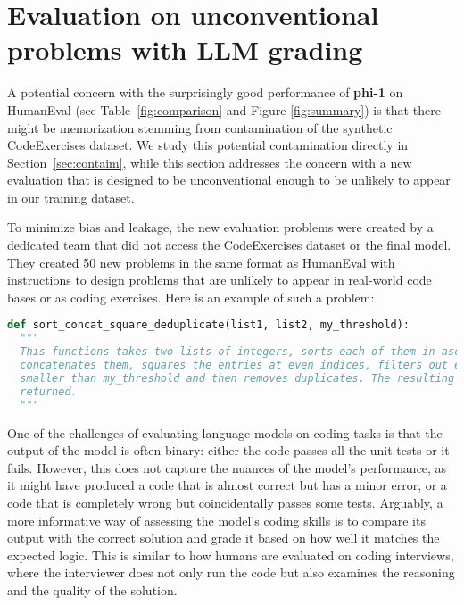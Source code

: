 \section{Evaluation on unconventional problems with LLM grading} \label{sec:gpteval}

A potential concern with the surprisingly good performance of \textbf{phi-1} on HumanEval (see Table~\ref{fig:comparison} and Figure \ref{fig:summary}) is that there might be memorization stemming from contamination of the synthetic CodeExercises dataset. %
We study this potential contamination directly in Section~\ref{sec:contaim}, while this section addresses the concern with a new evaluation that is designed to be unconventional enough to be unlikely to appear in our training dataset.

To minimize bias and leakage, the new evaluation problems were created by a dedicated team that did not access the CodeExercises dataset or the final model. They created 50 new problems in the same format as HumanEval with instructions to design problems that are unlikely to appear in real-world code bases or as coding exercises. Here is an example of such a problem:

\begin{AIbox}{}
\begin{lstlisting}[language=Python, style=mystyle]
def sort_concat_square_deduplicate(list1, list2, my_threshold):
  """
  This functions takes two lists of integers, sorts each of them in ascending order,
  concatenates them, squares the entries at even indices, filters out entries
  smaller than my_threshold and then removes duplicates. The resulting list is
  returned.
  """
\end{lstlisting}
\end{AIbox}

One of the challenges of evaluating language models on coding tasks is that the output of the model is often binary: either the code passes all the unit tests or it fails. However, this does not capture the nuances of the model's performance, as it might have produced a code that is almost correct but has a minor error, or a code that is completely wrong but coincidentally passes some tests. Arguably, a more informative way of assessing the model's coding skills is to compare its output with the correct solution and grade it based on how well it matches the expected logic. This is similar to how humans are evaluated on coding interviews, where the interviewer does not only run the code but also examines the reasoning and the quality of the solution. 

